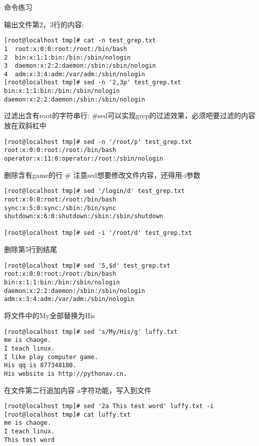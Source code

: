 \begin{ascolorbox10}{命令练习}
	\begin{ascboxJ}{输出文件第2，3行的内容:}
		\begin{lstlisting}[style=linux]
[root@localhost tmp]# cat -n test_grep.txt
1  root:x:0:0:root:/root:/bin/bash
2  bin:x:1:1:bin:/bin:/sbin/nologin
3  daemon:x:2:2:daemon:/sbin:/sbin/nologin
4  adm:x:3:4:adm:/var/adm:/sbin/nologin
[root@localhost tmp]# sed -n '2,3p' test_grep.txt
bin:x:1:1:bin:/bin:/sbin/nologin
daemon:x:2:2:daemon:/sbin:/sbin/nologin
		\end{lstlisting}
	\end{ascboxJ}
	\begin{ascboxJ}{过滤出含有root的字符串行:}
\#sed可以实现grep的过滤效果，必须吧要过滤的内容放在双斜杠中
		\begin{lstlisting}[style=linux]
[root@localhost tmp]# sed -n '/root/p' test_grep.txt  
root:x:0:0:root:/root:/bin/bash
operator:x:11:0:operator:/root:/sbin/nologin
		\end{lstlisting}
	\end{ascboxJ}
	\begin{ascboxJ}{删除含有game的行}
\# 注意sed想要修改文件内容，还得用-i参数
		\begin{lstlisting}[style=linux]
[root@localhost tmp]# sed '/login/d' test_grep.txt
root:x:0:0:root:/root:/bin/bash
sync:x:5:0:sync:/sbin:/bin/sync
shutdown:x:6:0:shutdown:/sbin:/sbin/shutdown

[root@localhost tmp]# sed -i '/root/d' test_grep.txt
		\end{lstlisting}
	\end{ascboxJ}
	\begin{ascboxJ}{删除第5行到结尾}
		\begin{lstlisting}[style=linux]
[root@localhost tmp]# sed '5,$d' test_grep.txt
root:x:0:0:root:/root:/bin/bash
bin:x:1:1:bin:/bin:/sbin/nologin
daemon:x:2:2:daemon:/sbin:/sbin/nologin
adm:x:3:4:adm:/var/adm:/sbin/nologin
		\end{lstlisting}
	\end{ascboxJ}
	\begin{ascboxJ}{将文件中的My全部替换为His}
		\begin{lstlisting}[style=linux]
[root@localhost tmp]# sed 's/My/His/g' luffy.txt
me is chaoge.
I teach linux.
I like play computer game.
His qq is 877348180.
His website is http://pythonav.cn.
		\end{lstlisting}
	\end{ascboxJ}
	\begin{ascboxJ}{在文件第二行追加内容 a字符功能，写入到文件}
		\begin{lstlisting}[style=linux]
[root@localhost tmp]# sed '2a This test word' luffy.txt -i
[root@localhost tmp]# cat luffy.txt
me is chaoge.
I teach linux.
This test word


\end{lstlisting}
\end{ascboxJ}
\end{ascolorbox10}
